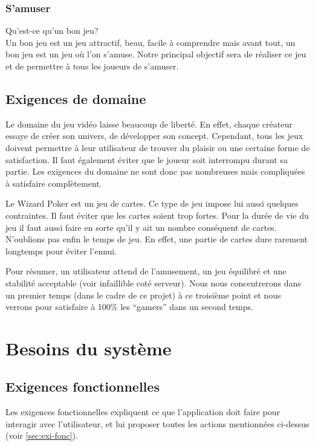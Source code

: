 \documentclass[11pt,a4paper]{article}
\begin{document}
\subsubsection*{S'amuser}
Qu'est-ce qu'un bon jeu?\\
Un bon jeu est un jeu attractif, beau, facile à comprendre mais avant tout, un bon jeu est un jeu où l'on s'amuse. Notre principal objectif sera de réaliser ce jeu et de permettre à tous les joueurs de s'amuser.


\subsection{Exigences de domaine}
\label{sec:exi-dom}

Le domaine du jeu vidéo laisse beaucoup de liberté.  En effet, chaque créateur essaye de créer son univers, de développer son concept.  Cependant, tous les jeux doivent permettre à leur utilisateur de trouver du plaisir ou une certaine forme de satisfaction.  Il faut également éviter que le joueur soit interrompu durant sa partie.  Les exigences du domaine ne sont donc pas nombreuses mais compliquées à satisfaire complètement.

Le Wizard Poker est un jeu de cartes.  Ce type de jeu impose lui aussi quelques contraintes.  Il faut éviter que les cartes soient trop fortes.  Pour la durée de vie du jeu il faut aussi faire en sorte qu'il y ait un nombre conséquent de cartes.  N'oublions pas enfin le temps de jeu.  En effet, une partie de cartes dure rarement longtemps pour éviter l'ennui.

Pour résumer, un utilisateur attend de l'amusement, un jeu équilibré et une stabilité acceptable (voir infaillible coté serveur).  Nous nous concentrerons dans un premier temps (dans le cadre de ce projet) à ce troisième point et nous verrons pour satisfaire à 100\% les ``gamers'' dans un second temps.



\section{Besoins du système}
\label{sec:besoins-sys}

\subsection{Exigences fonctionnelles}
\label{sec:exi-fonc-sys}

Les exigences fonctionnelles expliquent ce que l'application doit
faire pour interagir avec l'utilisateur, et lui proposer toutes les
actions mentionnées ci-dessus (voir \ref{sec:exi-fonc}).
\end{document}
